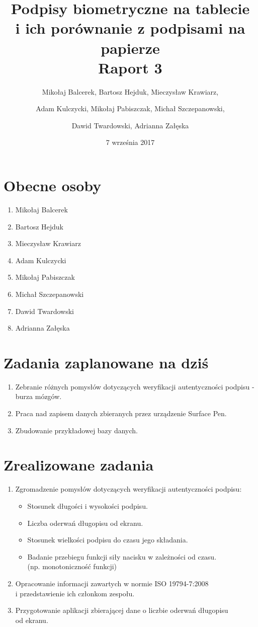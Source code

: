 \documentclass{mwrep}
\title{Podpisy biometryczne na tablecie \\ i ich porównanie z podpisami na papierze\\ 
Raport 3}
\author{Mikołaj Balcerek, Bartosz Hejduk, Mieczysław Krawiarz, \and Adam Kulczycki, Mikołaj Pabiszczak, Michał Szczepanowski, \and Dawid Twardowski, Adrianna Załęska}
\date{7 września 2017}
\begin{document}
\maketitle
{\let\clearpage\relax 
\chapter{Obecne osoby}}
\begin{enumerate}
    \item Mikołaj Balcerek
    \item Bartosz Hejduk
    \item Mieczysław Krawiarz
    \item Adam Kulczycki
    \item Mikołaj Pabiszczak
    \item Michał Szczepanowski
    \item Dawid Twardowski
    \item Adrianna Załęska
\end{enumerate}


{\let\clearpage\relax 
\chapter{Zadania zaplanowane na dziś}}
\begin{enumerate}
	\item Zebranie różnych pomysłów dotyczących weryfikacji autentyczności podpisu - burza mózgów.
	\item Praca nad zapisem danych zbieranych przez urządzenie Surface Pen.
	\item Zbudowanie przykładowej bazy danych.
\end{enumerate}


{\let\clearpage\relax 
\chapter{Zrealizowane zadania}}
\begin{enumerate}
	\item Zgromadzenie pomysłów dotyczących weryfikacji autentyczności podpisu:
		\begin{itemize}
		\item Stosunek długości i wysokości podpisu.
		\item Liczba oderwań długopisu od ekranu.
		\item Stosunek wielkości podpisu do czasu jego składania.
		\item Badanie przebiegu funkcji siły nacisku w zależności od czasu. \\ (np. monotoniczność funkcji)
		\end{itemize}
	\item Opracowanie informacji zawartych w normie ISO 19794-7:2008 \\ i przedstawienie ich członkom zespołu.
	\item Przygotowanie aplikacji zbierającej dane o liczbie oderwań długopisu \\ od ekranu.
	\end{enumerate}
\end{document}
